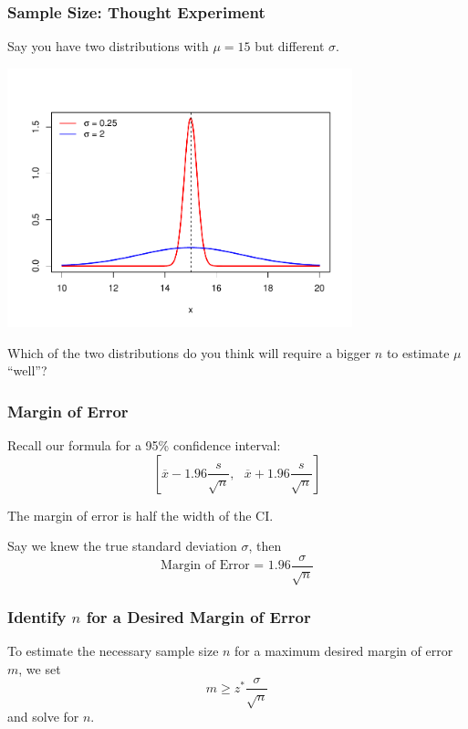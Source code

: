 \documentclass[handout]{beamer}
\newcommand{\blue}[1]{\textcolor{blue2}{#1}}
\begin{document}
\begin{frame}
\frametitle{Sample Size:  Thought Experiment}
Say you have two distributions with $\mu=15$ but different $\sigma$.
\begin{center}
\includegraphics[width=0.75\textwidth]{figure/norm.pdf}
\end{center}
\pause Which of the two distributions do you think will require a bigger $n$ to estimate $\mu$ ``well''?
\end{frame}


\begin{frame}
\frametitle{Margin of Error}
Recall our formula for a 95\% confidence interval:
\[\left[
\overline{x} - 1.96 \frac{s}{\sqrt n}, \mbox{  }
\overline{x} + 1.96 \frac{s}{\sqrt n}
\right]\]

\pause The \blue{margin of error} is half the width of the CI.\\

\vspace{0.25cm}

\pause Say we knew the \blue{true} standard deviation $\sigma$, then
\[
\mbox{Margin of Error = } 1.96 \frac{\sigma}{\sqrt n} 
\]
\end{frame}



\begin{frame}
\frametitle{Identify $n$ for a Desired Margin of Error}
%
%
To estimate the necessary sample size $n$ for a maximum desired margin of error $m$, we set
\[
m \geq z^* \frac{\sigma}{\sqrt{n}}
\]
and solve for $n$.  
\end{frame}
\end{document}
